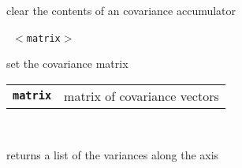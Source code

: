 \begin{description}
\begin{description}
        clear the contents of an covariance accumulator

       \texttt{ $<$matrix$>$} \

        set the covariance matrix

      \begin{tabular}{ll}
 \texttt{\textbf{matrix}} &  matrix of covariance vectors  \\
      \end{tabular}
       \texttt{} \

        returns a list of the variances along the axis

    \end{description}

\end{description}

